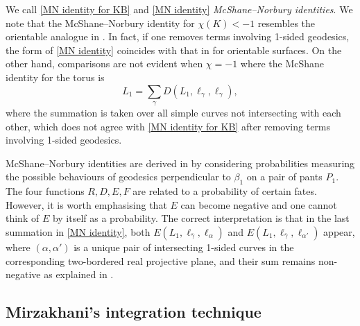 \documentclass[12pt]{amsart}
\theoremstyle{plain}
\theoremstyle{definition}
\theoremstyle{remark}
\numberwithin{equation}{section}
\begin{document}
We call \eqref{MN identity for KB} and \eqref{MN identity} \emph{McShane--Norbury identities}. We note that the McShane--Norbury identity for $\chi(K)<-1$ resembles the orientable analogue in \cite{Mir06}. In fact, if one removes terms involving 1-sided geodesics, the form of \eqref{MN identity} coincides with that in \cite{Mir06} for orientable surfaces. On the other hand, comparisons are not evident when $\chi=-1$ where the McShane identity for the torus is
\begin{equation*}
L_1=\sum_{\gamma}D(L_1,\ell_{\gamma},\ell_{\gamma}),
\end{equation*}
where the summation is taken over all simple curves not intersecting with each other, which does not agree with \eqref{MN identity for KB} after removing  terms involving 1-sided geodesics.

McShane--Norbury identities are derived in \cite{Nor07} by considering probabilities measuring the possible behaviours of geodesics perpendicular to $\beta_1$ on a pair of pants $P_1$. The four functions $R,D,E,F$ are related to a probability of certain fates. However, it is worth emphasising that $E$ can become negative and one cannot think of $E$ by itself as a probability. The correct interpretation is that in the last summation in \eqref{MN identity}, both $E(L_1,\ell_{\bar\gamma},\ell_\alpha)$ and $E(L_1,\ell_{\bar\gamma},\ell_{\alpha'})$ appear, where $(\alpha,\alpha')$  is a unique pair of intersecting 1-sided curves in the corresponding two-bordered real projective plane, and their sum remains non-negative as explained in \cite{Nor07}.





\subsection{Mirzakhani's integration technique}\label{sec:unfolding}
\end{document}

